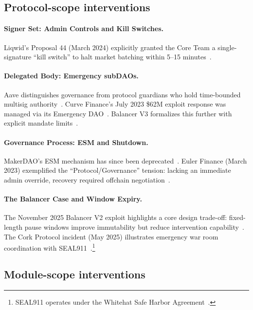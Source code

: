 \documentclass[12pt]{article}
\begin{document}
\subsection{Protocol-scope interventions}
\label{sec:incidents-protocol}

\paragraph{Signer Set: Admin Controls and Kill Switches.}
Liqwid's Proposal 44 (March 2024) explicitly granted the Core Team a single-signature ``kill switch'' to halt market batching within 5--15 minutes~\cite{Liqwid2024Governance}.

\paragraph{Delegated Body: Emergency subDAOs.}
Aave distinguishes governance from protocol guardians who hold time-bounded multisig authority~\cite{AaveGuardians,AaveACLManager}. Curve Finance's July 2023 \$62M exploit response was managed via its Emergency DAO~\cite{CurveExploitLlamaRisk}. Balancer V3 formalizes this further with explicit mandate limits~\cite{BalancerV3EmergencySubDAO}.

\paragraph{Governance Process: ESM and Shutdown.}
MakerDAO's ESM mechanism has since been deprecated~\cite{MakerDAOEmergencyShutdown}. Euler Finance (March 2023) exemplified the ``Protocol/Governance'' tension: lacking an immediate admin override, recovery required offchain negotiation~\cite{Euler2023Exploit}.

\paragraph{The Balancer Case and Window Expiry.}
The November 2025 Balancer V2 exploit highlights a core design trade-off: fixed-length pause windows improve immutability but reduce intervention capability~\cite{BalancerPostMortem2025,BalancerV3EmergencySubDAO}. The Cork Protocol incident (May 2025) illustrates emergency war room coordination with SEAL911~\cite{CorkPostMortem2025}.\footnote{SEAL911 operates under the Whitehat Safe Harbor Agreement~\cite{seal911github,dedaubseal,piperwhitehat}.}

\subsection{Module-scope interventions}
\label{sec:incidents-module}
\end{document}
